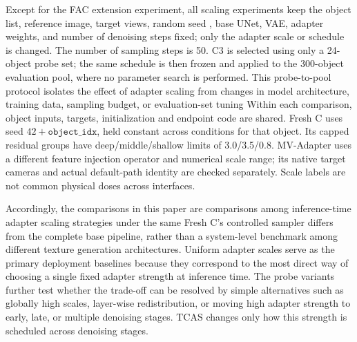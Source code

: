 \documentclass[times,twocolumn,final]{elsarticle}
\providecommand{\DIFadd}[1]{{\protect\color{blue} \sf #1}} %
\providecommand{\DIFdel}[1]{{\protect\color{red} \scriptsize #1}} %
\providecommand{\DIFaddbegin}{} %
\providecommand{\DIFaddend}{} %
\providecommand{\DIFdelbegin}{} %
\providecommand{\DIFdelend}{} %
\begin{document}
\DIFdelbegin \DIFdel{Except for the FAC extension experiment, all scaling experiments keep the object list, reference image, target views, random seed , base UNet, VAE, adapter weights, and number of denoising steps fixed; only the adapter scale or schedule is changed. The number of sampling steps is 50. C3 is selected using only a 24-object probe set; the same schedule is then frozen and applied to the 300-object evaluation pool, where no parameter search is performed. This probe-to-pool protocol isolates the effect of adapter scaling from changes in model architecture, training data, sampling budget, or evaluation-set tuning}\DIFdelend \DIFaddbegin \DIFadd{Within each comparison, object inputs, targets, initialization and endpoint code are shared. Fresh C uses seed $42+\texttt{object\_idx}$, held constant across conditions for that object. Its capped residual groups have deep/middle/shallow limits of 3.0/3.5/0.8. MV-Adapter uses a different feature injection operator and numerical scale range; its native target cameras and actual default-path identity are checked separately. Scale labels are not common physical doses across interfaces}\DIFaddend .

\DIFdelbegin \DIFdel{Accordingly, the comparisons in this paper are comparisons among inference-time adapter scaling strategies under the same }\DIFdelend \DIFaddbegin \DIFadd{Fresh C's controlled sampler differs from the complete }\DIFaddend base pipeline, \DIFdelbegin \DIFdel{rather than a system-level benchmark among different texture generation architectures. Uniform adapter scales serve as the primary deployment baselines because they correspond to the most direct way of choosing a single fixed adapter strength at inference time. The probe variants further test whether the trade-off can be resolved by simple alternatives such as globally high scales, layer-wise redistribution, or moving high adapter strength to early, late, or multiple denoising stages. TCAS changes only how this strength is scheduled across denoising stages. }%

\end{document}
